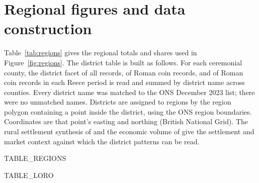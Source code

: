 \documentclass[11pt,a4paper]{article}
\begin{document}
\section{Regional figures and data construction}\label{sec:appx}
Table~\ref{tab:regions} gives the regional totals and shares used in Figure~\ref{fig:regions}. The district table is built as follows. For each ceremonial county, the district facet of all records, of Roman coin records, and of Roman coin records in each Reece period is read and summed by district name across counties. Every district name was matched to the ONS December 2023 list; there were no unmatched names. Districts are assigned to regions by the region polygon containing a point inside the district, using the ONS region boundaries. Coordinates are that point's easting and northing (British National Grid). The rural settlement synthesis of \citet{smith2016} and the economic volume of \citet{allen2017} give the settlement and market context against which the district patterns can be read.

{{TABLE_REGIONS}}

{{TABLE_LORO}}
\end{document}
